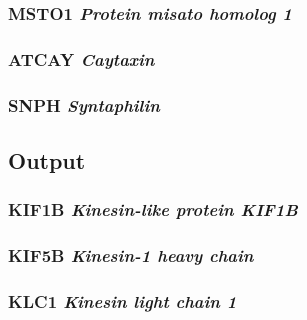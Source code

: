 \subsubsection{MSTO1 \textit{Protein misato homolog 1}}

\subsubsection{ATCAY \textit{Caytaxin}}

\subsubsection{SNPH \textit{Syntaphilin}}

\subsection{Output}

\subsubsection{KIF1B \textit{Kinesin-like protein KIF1B}}

\subsubsection{KIF5B \textit{Kinesin-1 heavy chain}}

\subsubsection{KLC1 \textit{Kinesin light chain 1}}





